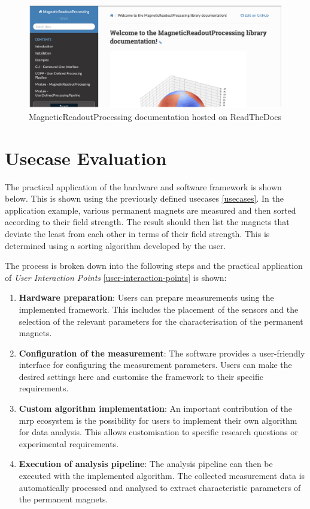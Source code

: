 \begin{figure}
\centering
\includegraphics{./generated_images/border_MagneticReadoutProcessing_documentation_hosted_on_ReadTheDocs.png}
\caption{MagneticReadoutProcessing documentation hosted on ReadTheDocs
\label{MagneticReadoutProcessing_documentation_hosted_on_ReadTheDocs.png}}
\end{figure}

\hypertarget{usecase-evaluation}{%
\chapter{Usecase Evaluation}\label{usecase-evaluation}}

The practical application of the hardware and software framework is
shown below. This is shown using the previously defined usecases
\ref{usecases}. In the application example, various permanent magnets
are measured and then sorted according to their field strength. The
result should then list the magnets that deviate the least from each
other in terms of their field strength. This is determined using a
sorting algorithm developed by the user.

The process is broken down into the following steps and the practical
application of \emph{User Interaction Points}
\ref{user-interaction-points} is shown:

\begin{enumerate}
\def\labelenumi{\arabic{enumi}.}
\item
  \textbf{Hardware preparation}: Users can prepare measurements using
  the implemented framework. This includes the placement of the sensors
  and the selection of the relevant parameters for the characterisation
  of the permanent magnets.
\item
  \textbf{Configuration of the measurement}: The software provides a
  user-friendly interface for configuring the measurement parameters.
  Users can make the desired settings here and customise the framework
  to their specific requirements.
\item
  \textbf{Custom algorithm implementation}: An important contribution of
  the \gls{mrp} ecosystem is the possibility for users to implement
  their own algorithm for data analysis. This allows customisation to
  specific research questions or experimental requirements.
\item
  \textbf{Execution of analysis pipeline}: The analysis pipeline can
  then be executed with the implemented algorithm. The collected
  measurement data is automatically processed and analysed to extract
  characteristic parameters of the permanent magnets.
\end{enumerate}

